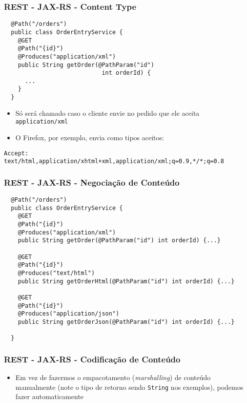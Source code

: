 \documentclass[Ligatures=TeX,table,brazil,svgnames,usetotalslideindicator,comp
ress,10pt]{beamer}
\begin{document}
\begin{frame}[fragile]
  \frametitle{REST - JAX-RS - Content Type}

\begin{verbatim}
  @Path("/orders")
  public class OrderEntryService {
    @GET
    @Path("{id}")
    @Produces("application/xml")
    public String getOrder(@PathParam("id")
                            int orderId) {
      ...
    }
  }
\end{verbatim}

\begin{itemize}
\item Só será chamado caso o cliente envie no pedido que ele aceita \texttt{application/xml}
\item O Firefox, por exemplo, envia como tipos aceitos:\\
\end{itemize}
    \footnotesize{\texttt{Accept: text/html,application/xhtml+xml,application/xml;q=0.9,*/*;q=0.8}}

\end{frame}


\begin{frame}[fragile]
  \frametitle{REST - JAX-RS - Negociação de Conteúdo}

{\footnotesize
\begin{verbatim}
  @Path("/orders")
  public class OrderEntryService {
    @GET
    @Path("{id}")
    @Produces("application/xml")
    public String getOrder(@PathParam("id") int orderId) {...}

    @GET
    @Path("{id}")
    @Produces("text/html")
    public String getOrderHtml(@PathParam("id") int orderId) {...}

    @GET
    @Path("{id}")
    @Produces("application/json")
    public String getOrderJson(@PathParam("id") int orderId) {...}

  }
\end{verbatim}
}

\end{frame}

\begin{frame}[fragile]
  \frametitle{REST - JAX-RS - Codificação de Conteúdo}
  \begin{itemize}
  \item Em vez de fazermos o empacotamento (\emph{marshalling}) de
    conteúdo manualmente (note o tipo de retorno sendo \texttt{String}
    nos exemplos), podemos fazer automaticamente
  \end{itemize}
\end{frame}
\end{document}
